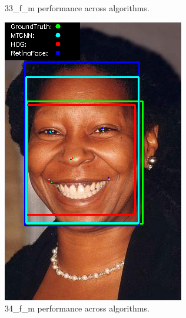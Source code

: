 \documentclass{l4proj}
\begin{document}
\begin{appendices}
\begin{figure}[h!]
\begin{minipage}{0.49\textwidth}
    \caption{33\_f\_m performance across algorithms.}
    \label{whoopi_result}
  \end{minipage}
\end{figure}

\begin{figure}[h!]
  \centering
  \begin{minipage}{0.49\textwidth}
    \centering
     \includegraphics[width=\textwidth]{images/appendix/34.png}
    \caption{34\_f\_m performance across algorithms.}
    \label{whoopi_result}
  \end{minipage}
    \hfill
    \begin{minipage}{0.49\textwidth}
    \centering

\end{minipage}
\end{figure}
\end{appendices}
\end{document}
